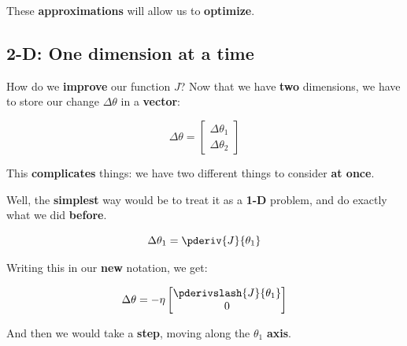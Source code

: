         These \textbf{approximations} will allow us to \textbf{optimize}.

    \subsection*{2-D: One dimension at a time}
        
        How do we \textbf{improve} our function $J$? Now that we have \textbf{two} dimensions, we have to store our change $\Delta \theta$ in a \textbf{vector}:
        
        \begin{equation}
            \Delta \theta
            =
            \begin{bmatrix}
                  \Delta \theta_1 \\ \Delta \theta_2 
            \end{bmatrix}
        \end{equation}
        
        This \textbf{complicates} things: we have two different things to consider \textbf{at once}.
        
        Well, the \textbf{simplest} way would be to treat it as a \textbf{1-D} problem, and do exactly what we did \textbf{before}. 
        
        \begin{equation}
            \Delta \theta_1 = \pderiv{J}{\theta_1}
        \end{equation}
        
        Writing this in our \textbf{new} notation, we get:
        
        \begin{equation}
            \Delta \theta
            =
            - \eta 
            \begin{bmatrix}
                  \pderivslash{J}{\theta_1} \\ 0 
            \end{bmatrix}
        \end{equation}
        
        And then we would take a \textbf{step}, moving along the $\theta_1$ \textbf{axis}.
        
